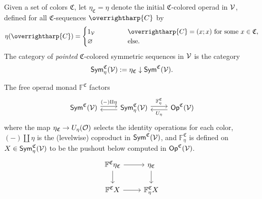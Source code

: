 \documentclass[a4paper,10pt
,draft
]{article}%
\renewcommand{\1}{\eta}%
\newcommand{\vect}[1]{\text{\overrightharp{\ensuremath{#1}}}}
\begin{document}
\begin{definition}
      Given a set of colors $\mathfrak C$, let $\eta_{\mathfrak C} = \eta$ denote the initial $\mathfrak C$-colored operad in $\mathcal V$,
      defined for all $\mathfrak C$-sequences $\vect C$ by
      \[
            \eta(\vect C) =
            \begin{cases}
                  1_\V \qquad \qquad & \vect C = (x;x) \mbox{ for some $x \in \mathfrak C$,}
                  \\
                  \varnothing & \mbox{else.}
            \end{cases}
      \]
      The category of \textit{pointed} $\mathfrak C$-colored symmetric sequences in $\mathcal V$ is the category
      \[
            \mathsf{Sym}^{\mathfrak C}_\eta(\mathcal V) := \eta_{\mathfrak C} \downarrow \mathsf{Sym}^{\mathfrak C}(\mathcal V).
      \]
\end{definition}

The free operad monad $\mathbb F^{\mathfrak C}$ factors
\begin{equation}
      \label{FC_FAC_EQ}
      \begin{tikzcd}
            \Sym^{\mathfrak C}(\V) \arrow[r, shift left, "{(-) \amalg \eta}"]
            &
            \Sym^{\mathfrak C}_\eta(\V) \arrow[l, shift left] \arrow[r, shift left, "\mathbb F^{\mathfrak C}_\eta"]
            &
            \Op^{\mathfrak C}(\V) \arrow[l, shift left, "U_\eta"]
      \end{tikzcd}
\end{equation}
where the map $\eta_{\mathfrak C} \to U_\eta(\mathcal{O})$ selects the identity operations for each color,
$(-) \amalg \eta$ is the (levelwise) coproduct in $\mathsf{Sym}^{\mathfrak C}(\mathcal V)$,
and $\mathbb F^{\mathfrak C}_\eta$ is defined on $X \in \mathsf{Sym}^{\mathfrak C}_\eta(\mathcal V)$ to be the pushout below computed in $\mathsf{Op}^{\mathfrak C}(\mathcal V)$.
\[
      \begin{tikzcd}
            \mathbb F^{\mathfrak C} \eta_{\mathfrak C} \arrow[d] \arrow[r]
            &
            \eta_{\mathfrak C} \arrow[d]
            \\
            \mathbb F^{\mathfrak C} X \arrow[r]
            &
            \mathbb F^{\mathfrak C}_\eta X
      \end{tikzcd}
\]

\end{document}

